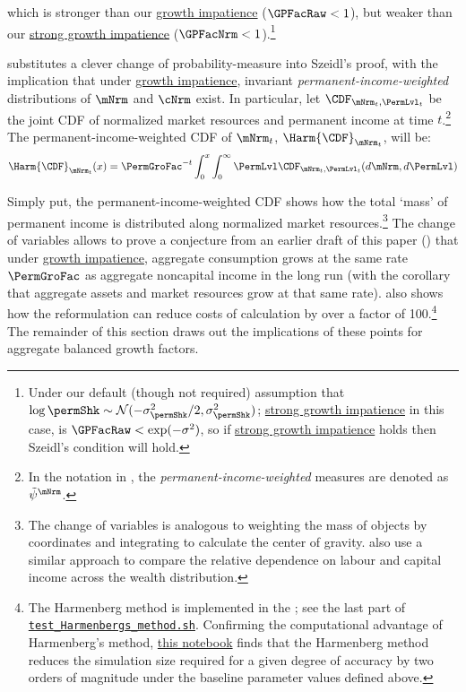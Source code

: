 \documentclass[BufferStockTheory]{subfiles}
\begin{document}
which is stronger than our \hyperlink{GICRaw}{growth impatience} ($\GPFacRaw < 1$), but weaker than our \hyperlink{GICMod}{strong growth impatience}  ($\GPFacNrm < 1$).\footnote{Under our default (though not required) assumption that $\log \permShk \sim \mathcal{N}(-\sigma^{2}_{\permShk}/2,\sigma^{2}_{\permShk})$; \hyperlink{GICMod}{strong growth impatience} in this case, is $\GPFacRaw < \exp(-\sigma^{2})$, so if \hyperlink{GICMod}{strong growth impatience} holds then Szeidl's condition will hold.}

\hypertarget{Growth-Rates-of-Aggregate-Income-and-Consumption}{}

\cite{harmenbergInvariant} substitutes a clever change of probability-measure into Szeidl's proof, with the implication that under \hyperlink{GICRaw}{growth impatience}, invariant \emph{permanent-income-weighted} distributions of $\mNrm$ and $\cNrm$ exist. In particular, let $\CDF_{\mNrm_{t},\PermLvl_{t}}$ be the joint CDF of normalized market resources and permanent income at time $t$.\footnote{In the notation in \cite{harmenbergInvariant}, the \emph{permanent-income-weighted} measures are denoted as $\tilde{\psi}^{\mNrm}$.} The permanent-income-weighted CDF of $\mNrm_{t}$, $\Harm{\CDF}_{\mNrm_{t}}$, will be:
%
%
%
\begin{equation}\label{eq:HarmCDF}
\Harm{\CDF}_{\mNrm_{t}}(x) = \PermGroFac^{-t}\int_{0}^{x}\int_{0}^{\infty} \PermLvl\CDF_{\mNrm_{t},\PermLvl_{t}}(d\mNrm,d\PermLvl)
\end{equation}

Simply put, the permanent-income-weighted CDF shows how the total `mass' of permanent income is distributed along normalized market resources.\footnote{The change of variables is analogous to weighting the mass of objects by coordinates and integrating to calculate the center of gravity. \cite{wolf2021play} also use a similar approach to compare the relative dependence on labour and capital income across the wealth distribution.} The change of variables allows \cite{harmenbergInvariant} to prove a conjecture from an earlier draft of this paper (\cite{BufferStockTheoryQESubmit}) that under \hyperlink{GICRaw}{growth impatience}, aggregate consumption grows at the same rate $\PermGroFac$ as aggregate noncapital income in the long run (with the corollary that aggregate assets and market resources grow at that same rate).\hypertarget{test-Harmenbergs-method}{} \cite{harmenbergInvariant} also shows how the reformulation can reduce costs of calculation by over a factor of 100.\footnote{The Harmenberg method is implemented in the {\ARKurl}; see the last part of \href{https://github.com/econ-ark/BufferStockTheory/blob/master/Code/Python/test_Harmenbergs_method.sh}{\texttt{test\_Harmenbergs\_method.sh}}. Confirming the computational advantage of Harmenberg's method, \href{https://econ-ark.org/materials/harmenberg-aggregation}{this notebook} finds that the Harmenberg method reduces the simulation size required for a given degree of accuracy by two orders of magnitude under the baseline parameter values defined above.} The remainder of this section draws out the implications of these points for aggregate balanced growth factors. 
\end{document}
